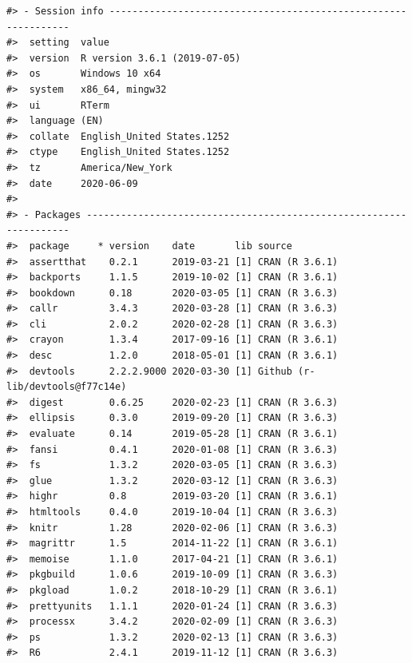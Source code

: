 \documentclass[
]{article}
\begin{document}
\begin{verbatim}
#> - Session info ---------------------------------------------------------------
#>  setting  value                       
#>  version  R version 3.6.1 (2019-07-05)
#>  os       Windows 10 x64              
#>  system   x86_64, mingw32             
#>  ui       RTerm                       
#>  language (EN)                        
#>  collate  English_United States.1252  
#>  ctype    English_United States.1252  
#>  tz       America/New_York            
#>  date     2020-06-09                  
#> 
#> - Packages -------------------------------------------------------------------
#>  package     * version    date       lib source                         
#>  assertthat    0.2.1      2019-03-21 [1] CRAN (R 3.6.1)                 
#>  backports     1.1.5      2019-10-02 [1] CRAN (R 3.6.1)                 
#>  bookdown      0.18       2020-03-05 [1] CRAN (R 3.6.3)                 
#>  callr         3.4.3      2020-03-28 [1] CRAN (R 3.6.3)                 
#>  cli           2.0.2      2020-02-28 [1] CRAN (R 3.6.3)                 
#>  crayon        1.3.4      2017-09-16 [1] CRAN (R 3.6.1)                 
#>  desc          1.2.0      2018-05-01 [1] CRAN (R 3.6.1)                 
#>  devtools      2.2.2.9000 2020-03-30 [1] Github (r-lib/devtools@f77c14e)
#>  digest        0.6.25     2020-02-23 [1] CRAN (R 3.6.3)                 
#>  ellipsis      0.3.0      2019-09-20 [1] CRAN (R 3.6.3)                 
#>  evaluate      0.14       2019-05-28 [1] CRAN (R 3.6.1)                 
#>  fansi         0.4.1      2020-01-08 [1] CRAN (R 3.6.3)                 
#>  fs            1.3.2      2020-03-05 [1] CRAN (R 3.6.3)                 
#>  glue          1.3.2      2020-03-12 [1] CRAN (R 3.6.3)                 
#>  highr         0.8        2019-03-20 [1] CRAN (R 3.6.1)                 
#>  htmltools     0.4.0      2019-10-04 [1] CRAN (R 3.6.3)                 
#>  knitr         1.28       2020-02-06 [1] CRAN (R 3.6.3)                 
#>  magrittr      1.5        2014-11-22 [1] CRAN (R 3.6.1)                 
#>  memoise       1.1.0      2017-04-21 [1] CRAN (R 3.6.1)                 
#>  pkgbuild      1.0.6      2019-10-09 [1] CRAN (R 3.6.3)                 
#>  pkgload       1.0.2      2018-10-29 [1] CRAN (R 3.6.1)                 
#>  prettyunits   1.1.1      2020-01-24 [1] CRAN (R 3.6.3)                 
#>  processx      3.4.2      2020-02-09 [1] CRAN (R 3.6.3)                 
#>  ps            1.3.2      2020-02-13 [1] CRAN (R 3.6.3)                 
#>  R6            2.4.1      2019-11-12 [1] CRAN (R 3.6.3)                 

\end{verbatim}
\end{document}
